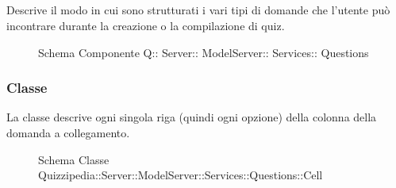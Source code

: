 \subsection{}
Descrive il modo in cui sono strutturati i vari tipi di domande che l'utente può incontrare durante la creazione o la compilazione di quiz.
\begin{figure}[H]
\centering
\noindent{}
\caption[Schema Componente Quizzipedia::Server::ModelServer::Services::Questions]{Schema Componente Q:: Server:: ModelServer:: Services:: Questions}
\end{figure}
\subsubsection{Classe }
La classe descrive ogni singola riga (quindi ogni opzione) della colonna della domanda a collegamento.
\begin{figure}[H]
\centering
\noindent{}
\caption[Schema Classe Cell]{Schema Classe Quizzipedia::Server::ModelServer::Services::Questions::Cell}
\end{figure}
